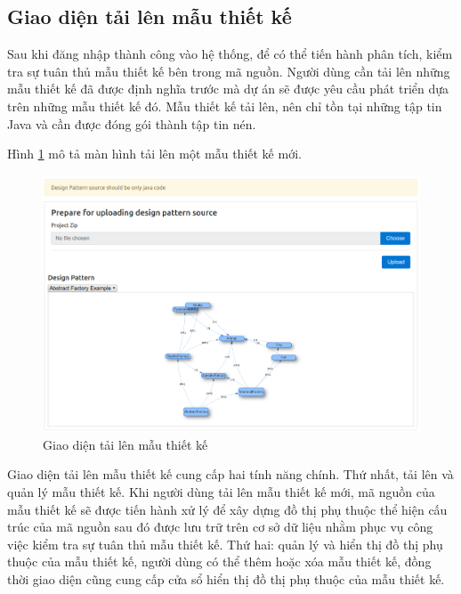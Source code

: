 \documentclass[12pt]{report}
\begin{document}
\subsection{Giao diện tải lên mẫu thiết kế}
Sau khi đăng nhập thành công vào hệ thống, để có thể tiến hành phân tích, kiểm tra sự tuân thủ mẫu thiết kế bên trong mã nguồn. Người dùng cần tải lên những mẫu thiết kế đã được định nghĩa trước mà dự án sẽ được yêu cầu phát triển dựa trên những mẫu thiết kế đó. Mẫu thiết kế tải lên, nên chỉ tồn tại những tập tin Java và cần được đóng gói thành tập tin nén.
 
\noindent Hình \ref{fig:ds_upload_example} mô tả màn hình tải lên một mẫu thiết kế mới.
\begin{figure}[h]
	\centering
	\includegraphics[scale=0.4]{images/ds_upload_example}
	\caption{Giao diện tải lên mẫu thiết kế}
	\label{fig:ds_upload_example}
\end{figure}
Giao diện tải lên mẫu thiết kế cung cấp hai tính năng chính. Thứ nhất, tải lên và quản lý mẫu thiết kế. Khi người dùng tải lên mẫu thiết kế mới, mã nguồn của mẫu thiết kế sẽ được tiến hành xử lý để xây dựng đồ thị phụ thuộc thể hiện cấu trúc của mã nguồn sau đó được lưu trữ trên cơ sở dữ liệu nhằm phục vụ công việc kiểm tra sự tuân thủ mẫu thiết kế. Thứ hai: quản lý và hiển thị đồ thị phụ thuộc của mẫu thiết kế, người dùng có thể thêm hoặc xóa mẫu thiết kế, đồng thời giao diện cũng cung cấp cửa sổ hiển thị đồ thị phụ thuộc của mẫu thiết kế.
\end{document}
